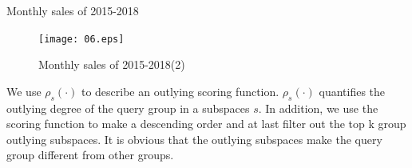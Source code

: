 \documentclass[
 size=14pt,
 paper=smartboard,  %
 mode=present, 		%
 display=slides, 	%
 style=tuliplab,  	%
 pauseslide,
 fleqn,leqno]{powerdot}
\begin{document}
\begin{slide}{Monthly sales of 2015-2018}
\begin{figure}     
\centering     
\texttt{[image: 06.eps]}     
\caption{Monthly sales of 2015-2018(2)}     
\end{figure}
\begin{note}
We use $\rho_s(\cdot)$ to describe an outlying scoring function.
$\rho_s(\cdot)$ quantifies the outlying degree of the query group in a subspaces $s$.
In addition,
we use the scoring function to make a descending order and at last
filter out the top k group outlying subspaces.
It is obvious that the outlying subspaces make the
query group different from other groups.
\end{note}

\end{slide}
\end{document}
